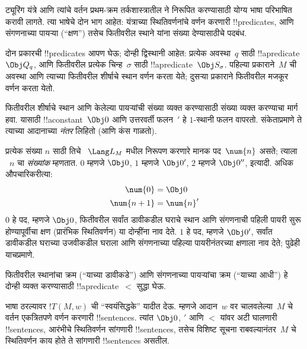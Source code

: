 \documentclass[../../../include/open-logic-section]{subfiles}
\begin{document}

\begin{explain}
ट्यूरिंग यंत्रे आणि त्यांचे वर्तन प्रथम-क्रम तर्कशास्त्रातील
ने निरूपित करण्यासाठी योग्य भाषा
परिभाषित करावी लागते. त्या भाषेचे दोन भाग आहेत:
यंत्राच्या स्थितिवर्णनांचे वर्णन करणारी !!{predicate}s, आणि संगणनाच्या पायऱ्या (“क्षण”)
तसेच फितीवरील स्थाने यांना संख्या देण्यासाठीचे
पदबंध.

दोन प्रकारची !!{predicate}s
आपण घेऊ; दोन्ही द्विस्थानी आहेत: प्रत्येक
अवस्था~$q$ साठी !!a{predicate}~$\Obj Q_q$,
आणि फितीवरील प्रत्येक चिन्ह~$\sigma$
साठी !!a{predicate}~$\Obj S_\sigma$.
पहिल्या प्रकाराने~$M$ ची अवस्था आणि
त्याच्या फितीवरील शीर्षाचे स्थान वर्णन
करता येते; दुसऱ्या प्रकाराने फितीवरील
मजकूर वर्णन करता येतो.

फितीवरील शीर्षाचे स्थान आणि केलेल्या
पायऱ्यांची संख्या व्यक्त करण्यासाठी
संख्या व्यक्त करण्याचा मार्ग हवा.
यासाठी !!a{constant}~$\Obj 0$
आणि उत्तरवर्ती फलन~$\prime$ हे
$1$-स्थानी फलन वापरतो. संकेताप्रमाणे
ते त्याच्या आदानाच्या \emph{नंतर}
लिहितो (आणि कंस गाळतो).

प्रत्येक संख्या $n$ साठी तिचे
~$\Lang L_M$ मधील निरूपण करणारे
मानक पद~$\num{n}$ असते; त्याला
~$n$ चा \emph{संख्यांक} म्हणतात.
$\num{0}$ म्हणजे $\Obj 0$,
$\num{1}$ म्हणजे $\Obj 0'$,
$\num{2}$ म्हणजे $\Obj 0''$,
इत्यादी. अधिक औपचारिकरीत्या:
\begin{align*}
\num{0} & = \Obj 0 \\
\num{n+1} &= \num{n}'
\end{align*}
$\num{0}$ हे पद, म्हणजे $\Obj 0$,
फितीवरील सर्वांत डावीकडील घराचे स्थान
आणि संगणनाची पहिली पायरी सुरू होण्यापूर्वीचा
क्षण (प्रारंभिक स्थितिवर्णन) या दोन्हींना
नाव देते. $\num{1}$ हे पद, म्हणजे
$\Obj 0'$, सर्वांत डावीकडील घराच्या
उजवीकडील घराला आणि संगणनाच्या
पहिल्या पायरीनंतरच्या क्षणाला नाव
देते; पुढेही याचप्रमाणे.

फितीवरील स्थानांचा क्रम (“याच्या डावीकडे”)
आणि संगणनाच्या पायऱ्यांचा क्रम (“याच्या
आधी”) हे दोन्ही व्यक्त करण्यासाठी
!!a{predicate}~$<$ सुद्धा घेऊ.

भाषा ठरल्यावर $!T(M,
w)$ ची “स्वयंसिद्धके” यादीत देऊ.
म्हणजे आदान~$w$ वर चालवलेल्या~$M$
चे वर्तन एकत्रितपणे वर्णन करणारी
!!{sentence}s. त्यांत
$\Obj 0$, $\prime$ आणि $<$ यांवर
अटी घालणारी !!{sentence}s,
आरंभीचे स्थितिवर्णन सांगणारी
!!{sentence}s, तसेच विशिष्ट सूचना
राबवल्यानंतर~$M$ चे स्थितिवर्णन
काय होते ते सांगणारी !!{sentence}s
असतील.
\end{explain}
\end{document}
